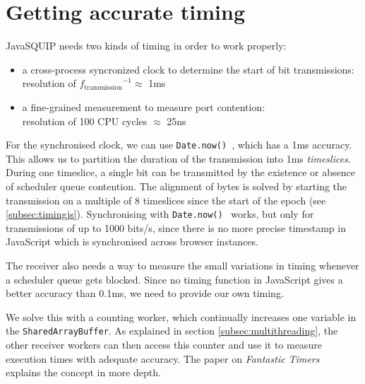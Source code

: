 \documentclass[11pt,
  titlepage=false,
  parskip=half,      %
]{scrreprt}
\begin{document}
\section{Getting accurate timing}
\label{sec:accurate-timing}
JavaSQUIP needs two kinds of timing in order to work properly:
\begin{itemize}
    \item a cross-process syncronized clock to determine the start of bit transmissions:\\
    resolution of ${f_{\text{transmission}}}^{-1} \approx$ 1ms
    \item a fine-grained measurement to measure port contention:\\
    resolution of 100 CPU cycles $\approx$ 25ns
\end{itemize}

For the synchronised clock, we can use \texttt{Date.now()}~\cite{datenow}, which has a 1ms accuracy.
This allows us to partition the duration of the transmission into 1ms \textit{timeslices}.
During one timeslice, a single bit can be transmitted by the existence or absence of scheduler queue contention.
The alignment of bytes is solved by starting the transmission on a multiple of 8 timeslices since the start of the epoch (see \ref{subsec:timingjs}).
Synchronising with \texttt{Date.now()}~\cite{datenow} works, but only for transmissions of up to 1000 bits/s,
since there is no more precise timestamp in JavaScript which is synchronised across browser instances.


The receiver also needs a way to measure the small variations in timing whenever a scheduler queue gets blocked.
Since no timing function in JavaScript gives a better accuracy than 0.1ms, we need to provide our own timing.

We solve this with a counting worker, which continually increases one variable in the \texttt{SharedArrayBuffer}.
As explained in section \ref{subsec:multithreading}, the other receiver workers can then access this counter and use it to measure execution times with adequate accuracy.
The paper on \textit{Fantastic Timers}~\cite{Schwarz2017Timers} explains the concept in more depth.
\end{document}
